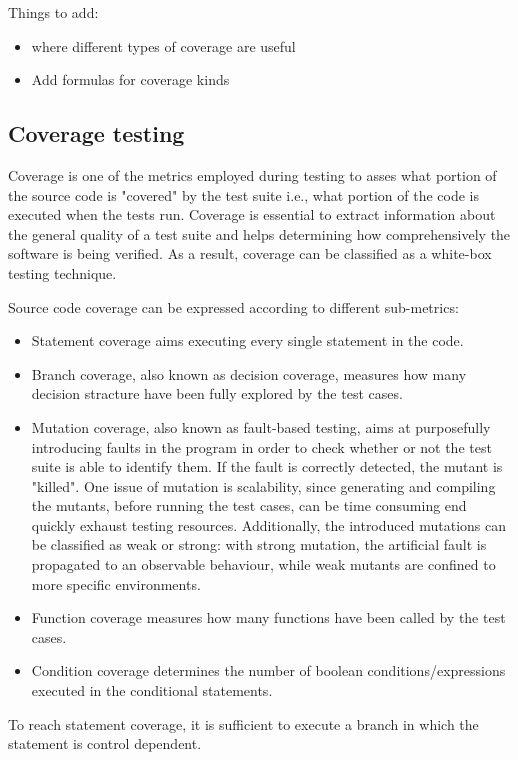 Things to add:
\begin{itemize}
    \item where different types of coverage are useful
    \item Add formulas for coverage kinds
\end{itemize}


\subsection*{Coverage testing}
Coverage is one of the metrics employed during testing to asses what portion of the source code is "covered" by the test suite i.e., 
what portion of the code is executed when the tests run. Coverage is essential to extract information about the general quality of a test suite
and helps determining how comprehensively the software is being verified.
As a result, coverage can be classified as a white-box testing technique.


Source code coverage can be expressed according to different sub-metrics:
\begin {itemize}
    \item Statement coverage aims executing every single statement in the code.
    \item Branch coverage, also known as decision coverage, measures how many decision stracture have been fully explored by the test cases.
    \item Mutation coverage, also known as fault-based testing, aims at purposefully introducing faults in the program in order to 
            check whether or not the test suite is able to identify them. If the fault is correctly detected, the mutant is "killed".
            One issue of mutation is scalability, since generating and compiling the mutants, before running the test cases, can be time
            consuming end quickly exhaust testing resources. Additionally, the introduced mutations can be classified as weak or strong:
            with strong mutation, the artificial fault is propagated to an observable behaviour, while weak mutants are confined to more 
            specific environments.
    \item Function coverage measures how many functions have been called by the test cases.
    \item Condition coverage determines the number of boolean conditions/expressions executed in the conditional statements.
\end {itemize}
To reach statement coverage, it is sufficient to execute a branch in which the statement is control dependent.

